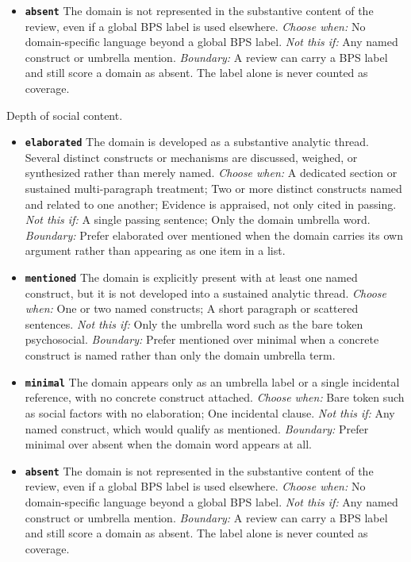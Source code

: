 \documentclass[11pt]{article}
\begin{document}
\begin{description}
\begin{itemize}[leftmargin=1.3em,itemsep=2pt,topsep=2pt]
  \item \textbf{\texttt{absent}} The domain is not represented in the substantive content of the review, even if a global BPS label is used elsewhere. {\small \textit{Choose when:} No domain-specific language beyond a global BPS label. \textit{Not this if:} Any named construct or umbrella mention. \textit{Boundary:} A review can carry a BPS label and still score a domain as absent. The label alone is never counted as coverage.}
  \end{itemize}
\item[\texttt{domain\_coverage\_social}] Depth of social content.
  \begin{itemize}[leftmargin=1.3em,itemsep=2pt,topsep=2pt]
  \item \textbf{\texttt{elaborated}} The domain is developed as a substantive analytic thread. Several distinct constructs or mechanisms are discussed, weighed, or synthesized rather than merely named. {\small \textit{Choose when:} A dedicated section or sustained multi-paragraph treatment; Two or more distinct constructs named and related to one another; Evidence is appraised, not only cited in passing. \textit{Not this if:} A single passing sentence; Only the domain umbrella word. \textit{Boundary:} Prefer elaborated over mentioned when the domain carries its own argument rather than appearing as one item in a list.}
  \item \textbf{\texttt{mentioned}} The domain is explicitly present with at least one named construct, but it is not developed into a sustained analytic thread. {\small \textit{Choose when:} One or two named constructs; A short paragraph or scattered sentences. \textit{Not this if:} Only the umbrella word such as the bare token psychosocial. \textit{Boundary:} Prefer mentioned over minimal when a concrete construct is named rather than only the domain umbrella term.}
  \item \textbf{\texttt{minimal}} The domain appears only as an umbrella label or a single incidental reference, with no concrete construct attached. {\small \textit{Choose when:} Bare token such as social factors with no elaboration; One incidental clause. \textit{Not this if:} Any named construct, which would qualify as mentioned. \textit{Boundary:} Prefer minimal over absent when the domain word appears at all.}
  \item \textbf{\texttt{absent}} The domain is not represented in the substantive content of the review, even if a global BPS label is used elsewhere. {\small \textit{Choose when:} No domain-specific language beyond a global BPS label. \textit{Not this if:} Any named construct or umbrella mention. \textit{Boundary:} A review can carry a BPS label and still score a domain as absent. The label alone is never counted as coverage.}
  \end{itemize}
\end{description}
\end{document}
